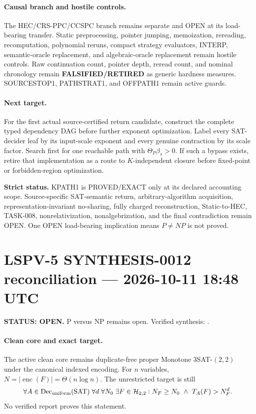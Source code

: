 \documentclass[11pt]{article}
\begin{document}
\paragraph{Causal branch and hostile controls.}
The HEC/CRS-PPC/CCSPC branch remains separate and OPEN at its load-bearing transfer. Static preprocessing, pointer jumping, memoization, rereading, recomputation, polynomial reruns, compact strategy evaluators, INTERP, semantic-oracle replacement, and algebraic-oracle replacement remain hostile controls. Raw continuation count, pointer depth, reread count, and nominal chronology remain \textbf{FALSIFIED/RETIRED} as generic hardness measures. SOURCESTOP1, PATHSTRAT1, and OFFPATH1 remain active guards.

\paragraph{Next target.}
For the first actual source-certified return candidate, construct the complete typed dependency DAG before further exponent optimization. Label every SAT-decider leaf by its input-scale exponent and every genuine contraction by its scale factor. Search first for one reachable path with \(\Theta_P\beta_s>0\). If such a bypass exists, retire that implementation as a route to \(K\)-independent closure before fixed-point or forbidden-region optimization.

\textbf{Strict status.} KPATH1 is PROVED/EXACT only at its declared accounting scope. Source-specific SAT-semantic return, arbitrary-algorithm acquisition, representation-invariant no-sharing, fully charged reconstruction, Static-to-HEC, TASK-008, nonrelativization, nonalgebrization, and the final contradiction remain OPEN. One OPEN load-bearing implication means \(P\neq NP\) is not proved.

\clearpage
\section{LSPV-5 SYNTHESIS-0012 reconciliation --- 2026-10-11 18:48 UTC}
\textbf{STATUS: OPEN.} P versus NP remains open.  Verified synthesis:
.

\paragraph{Clean core and exact target.}
The active clean core remains duplicate-free proper Monotone
$3$SAT-$(2,2)$ under the canonical indexed encoding.  For $n$ variables,
$N=|\operatorname{enc}(F)|=\Theta(n\log n)$.  The unrestricted target is
still
\[
 \forall A\in\operatorname{Dec}_{\rm uniform}(\mathrm{SAT})\;
 \forall d\;\forall N_0\;\exists F\in\mathcal H_{2,2}:
 N_F\ge N_0\ \wedge\ T_A(F)>N_F^d .
\]
No verified report proves this statement.
\end{document}
